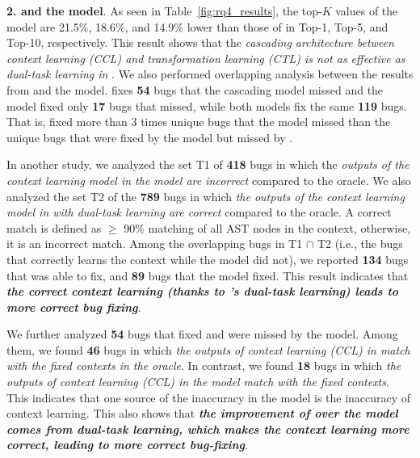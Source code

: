 {\bf 2. {\tool} and the  model}. As seen
in Table~\ref{fig:rq4_results}, the top-$K$ values of the
 model are 21.5\%, 18.6\%, and 14.9\% lower than those
of {\tool} in Top-1, Top-5, and Top-10, respectively. This result
shows that the {\em cascading architecture between context learning
  (CCL) and transformation learning (CTL) is not as effective as
  dual-task learning in {\tool}}.
%
We also performed overlapping analysis between the results from
{\tool} and the  model. {\tool} fixes {\bf 54} bugs
that the cascading model missed and the  model fixed
only {\bf 17} bugs that {\tool} missed, while both models fix the same
{\bf 119} bugs. That is, {\tool} fixed more than 3 times unique bugs
that the  model missed than the unique bugs that were
fixed by the  model but missed by {\tool}.




In another study, we analyzed the set T1 of {\bf 418} bugs in which
the {\em outputs of the context learning model in the 
  model are incorrect} compared to the oracle. We also analyzed the
set T2 of the {\bf 789} bugs in which {\em the outputs of the context
  learning model in {\tool} with dual-task learning are correct}
compared to the oracle. A correct match is defined as $\geq$ 90\%
matching of all AST nodes in the context, otherwise, it is an
incorrect match. Among the overlapping bugs in T1 $\cap$ T2 (i.e., the
bugs that {\tool} correctly learns the context while the
 model did not), we reported {\bf 134} bugs that
     {\tool} was able to fix, and {\bf 89} bugs that the
      model fixed.  This result indicates that {\bf {\em
       the correct context learning (thanks to {\tool}'s dual-task
       learning) leads to more correct bug fixing}}.

We further analyzed {\bf 54} bugs that {\tool} fixed and were missed
by the  model. Among them, we found {\bf 46} bugs in
which {\em the outputs of context learning (CCL) in {\tool} match with the fixed contexts
  in the oracle}. In contrast, we found {\bf 18} bugs in which {\em
  the outputs of context learning (CCL) in the  model match with the
  fixed contexts}. This indicates that one source of the inaccuracy in
the  model is the inaccuracy of context learning. This
also shows that {\bf {\em the improvement of {\tool} over the
   model comes from dual-task learning, which makes
  the context learning more correct, leading to more correct
  bug-fixing}}.

